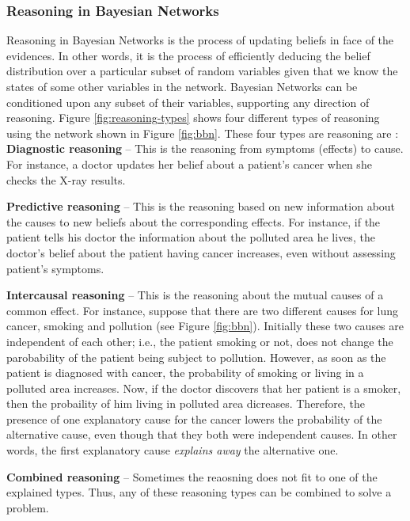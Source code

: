 \documentclass[11pt]{article}
\begin{document}
\subsubsection{Reasoning in Bayesian Networks}

Reasoning in Bayesian Networks is the process of updating beliefs in face of the
evidences. In other words, it is the process of efficiently deducing the belief
distribution over a particular subset of random variables given that we know
the states of some other variables in the network. Bayesian Networks can be
conditioned upon any subset of their variables, supporting any direction of
reasoning. Figure \ref{fig:reasoning-types} shows four different types of
reasoning using the network shown in Figure \ref{fig:bbn}. These four types are
reasoning are \cite{korb:bayesian-ai}:\\

\textbf{Diagnostic reasoning} -- This is the reasoning from symptoms (effects)
to cause. For instance, a doctor updates her belief about a patient's cancer
when she checks the X-ray results.

\textbf{Predictive reasoning} -- This is the reasoning based on new information
about the causes to new beliefs about the corresponding effects. For instance,
if the patient tells his doctor the information about the polluted area he
lives, the doctor's belief about the patient having cancer increases, even
without assessing patient's symptoms.

\textbf{Intercausal reasoning} -- This is the reasoning about the mutual causes
of a common effect. For instance,  suppose that there are two different causes
for lung cancer, smoking and pollution (see Figure \ref{fig:bbn}). Initially
these two causes are independent of each other; i.e., the patient smoking or
not, does not change the parobability of the patient being subject to pollution.
However, as soon as the patient is diagnosed with cancer, the probability of
smoking or living in a polluted area increases. Now, if the doctor discovers
that her patient is a smoker, then the probaility of him living in polluted area
dicreases. Therefore, the presence of one explanatory cause for the cancer
lowers the probability of the alternative cause, even though that they both were
independent causes. In other words, the first explanatory cause \textit{explains
away} the alternative one.

\textbf{Combined reasoning} -- Sometimes the reaosning does not fit to one of
the explained types. Thus, any of these reasoning types can be combined to solve
a problem.
\end{document}
